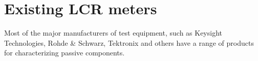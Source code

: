 \section{Existing LCR meters} \label{sec:ExistingLCRMeters}
Most of the major manufacturers of test equipment, such as Keysight Technologies, Rohde \& Schwarz, Tektronix and others have a range of products for characterizing passive components. 